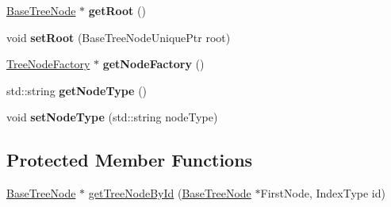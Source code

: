 \begin{DoxyCompactItemize}
\item 
\hypertarget{classffactory_1_1_base_tree_a0f805be68fba84631b7f14a35015e4f7}{\hyperlink{classffactory_1_1_base_tree_node}{Base\-Tree\-Node} $\ast$ {\bfseries get\-Root} ()}\label{classffactory_1_1_base_tree_a0f805be68fba84631b7f14a35015e4f7}

\item 
\hypertarget{classffactory_1_1_base_tree_a005a1f829660fd96b5f122489ad4ed97}{void {\bfseries set\-Root} (Base\-Tree\-Node\-Unique\-Ptr root)}\label{classffactory_1_1_base_tree_a005a1f829660fd96b5f122489ad4ed97}

\item 
\hypertarget{classffactory_1_1_base_tree_a6a3451d7304a3a97229d56a531fc9dd5}{\hyperlink{classffactory_1_1_tree_node_factory}{Tree\-Node\-Factory} $\ast$ {\bfseries get\-Node\-Factory} ()}\label{classffactory_1_1_base_tree_a6a3451d7304a3a97229d56a531fc9dd5}

\item 
\hypertarget{classffactory_1_1_base_tree_a1f06198d23a0c51e19b0fa54856869bd}{std\-::string {\bfseries get\-Node\-Type} ()}\label{classffactory_1_1_base_tree_a1f06198d23a0c51e19b0fa54856869bd}

\item 
\hypertarget{classffactory_1_1_base_tree_aaeba2efc8bfeb6886c989f5f519739fb}{void {\bfseries set\-Node\-Type} (std\-::string node\-Type)}\label{classffactory_1_1_base_tree_aaeba2efc8bfeb6886c989f5f519739fb}

\end{DoxyCompactItemize}
\subsection*{Protected Member Functions}
\begin{DoxyCompactItemize}
\item 
\hyperlink{classffactory_1_1_base_tree_node}{Base\-Tree\-Node} $\ast$ \hyperlink{classffactory_1_1_base_tree_a945b1bea9f210079c6688ec5a0c87018}{get\-Tree\-Node\-By\-Id} (\hyperlink{classffactory_1_1_base_tree_node}{Base\-Tree\-Node} $\ast$First\-Node, Index\-Type id)
\end{DoxyCompactItemize}
